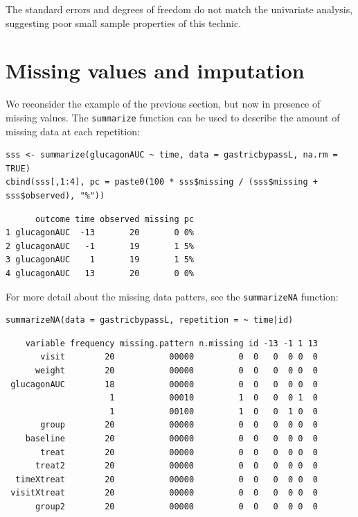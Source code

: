 \documentclass[12pt]{article}
\begin{document}
The standard errors and degrees of freedom do not match the univariate
analysis, suggesting poor small sample properties of this
technic.

\clearpage

\section{Missing values and imputation}
\label{sec:orgfd62c31}

We reconsider the example of the previous section, but now in presence
of missing values. The \texttt{summarize} function can be used to describe
the amount of missing data at each repetition:
\lstset{language=r,label= ,caption= ,captionpos=b,numbers=none}
\begin{lstlisting}
sss <- summarize(glucagonAUC ~ time, data = gastricbypassL, na.rm = TRUE)
cbind(sss[,1:4], pc = paste0(100 * sss$missing / (sss$missing + sss$observed), "%"))
\end{lstlisting}

\begin{verbatim}
      outcome time observed missing pc
1 glucagonAUC  -13       20       0 0%
2 glucagonAUC   -1       19       1 5%
3 glucagonAUC    1       19       1 5%
4 glucagonAUC   13       20       0 0%
\end{verbatim}


For more detail about the missing data patters, see the \texttt{summarizeNA}
function:
\lstset{language=r,label= ,caption= ,captionpos=b,numbers=none}
\begin{lstlisting}
summarizeNA(data = gastricbypassL, repetition = ~ time|id)
\end{lstlisting}

\begin{verbatim}
    variable frequency missing.pattern n.missing id -13 -1 1 13
       visit        20           00000         0  0   0  0 0  0
      weight        20           00000         0  0   0  0 0  0
 glucagonAUC        18           00000         0  0   0  0 0  0
                     1           00010         1  0   0  0 1  0
                     1           00100         1  0   0  1 0  0
       group        20           00000         0  0   0  0 0  0
    baseline        20           00000         0  0   0  0 0  0
       treat        20           00000         0  0   0  0 0  0
      treat2        20           00000         0  0   0  0 0  0
  timeXtreat        20           00000         0  0   0  0 0  0
 visitXtreat        20           00000         0  0   0  0 0  0
      group2        20           00000         0  0   0  0 0  0
\end{verbatim}
\end{document}
